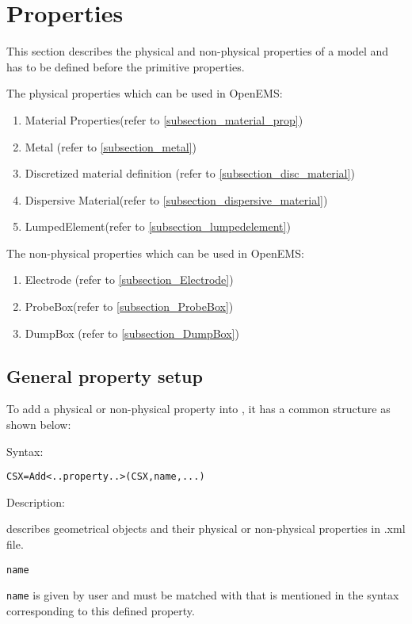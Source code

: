 \section{Properties}\label{csx_prop} 
This section describes the physical and non-physical properties of a model and has to be defined before the primitive properties. 


The physical properties which can be used in OpenEMS: 
 
\begin{enumerate}
\item Material Properties(refer to \ref{subsection_material_prop})
\item Metal (refer to \ref{subsection_metal})
\item Discretized material definition (refer to \ref{subsection_disc_material})
\item Dispersive Material(refer to \ref{subsection_dispersive_material})
\item LumpedElement(refer to \ref{subsection_lumpedelement})
\end{enumerate}


The non-physical properties which can be used in OpenEMS: 

\begin{enumerate}
\item Electrode (refer to \ref{subsection_Electrode})
\item ProbeBox(refer to \ref{subsection_ProbeBox})
\item DumpBox (refer to \ref{subsection_DumpBox})
\end{enumerate}


\subsection{General property setup}\label{subsection_gprop_setup}
To add a physical or non-physical property into \hyperref[CSX]{}, it has a common structure as shown below:

\begin{FontDescr}{Syntax:}
\begin{lstlisting} 
CSX=Add<..property..>(CSX,name,...)
\end{lstlisting} 
\end{FontDescr}

\begin{FontDescr}{Description:}
 \label{CSX}
\begin{myindentpar}
 describes geometrical objects and their physical or non-physical properties in .xml file.
\end{myindentpar}

\texttt{name} 
\begin{myindentpar}
\texttt{name} is given by user and must be matched with that is mentioned in the syntax corresponding to this defined property.  
\end{myindentpar}
\end{FontDescr}


